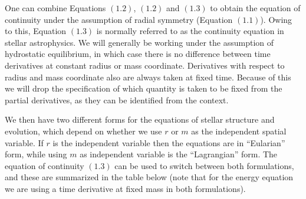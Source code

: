 \documentclass[twocolumn]{article}
\begin{document}
One can combine Equations \((1.2)\), \((1.2)\) and \((1.3)\) to obtain
the equation of continuity under the assumption of radial symmetry
(Equation \((1.1)\)). Owing to this, Equation \((1.3)\) is normally
referred to as the continuity equation in stellar astrophysics. We will
generally be working under the assumption of hydrostatic equilibrium, in
which case there is no difference between time derivatives at constant
radius or mass coordinate. Derivatives with respect to radius and mass
coordinate also are always taken at fixed time. Because of this we will
drop the specification of which quantity is taken to be fixed from the
partial derivatives, as they can be identified from the context.

We then have two different forms for the equations of stellar structure
and evolution, which depend on whether we use \(r\) or \(m\) as the
independent spatial variable. If \(r\) is the independent variable then
the equations are in ``Eularian'' form, while using \(m\) as independent
variable is the ``Lagrangian'' form. The equation of continuity
\((1.3)\) can be used to switch between both formulations, and these are
summarized in the table below (note that for the energy equation we are
using a time derivative at fixed mass in both formulations).

\end{document}
